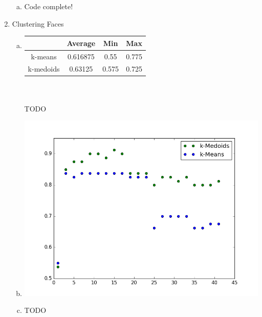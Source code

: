 \documentclass[11pt]{article}
\begin{document}
\begin{enumerate}[1]
\begin{enumerate}[(a)]
\item Code complete!
\end{enumerate}
\item Clustering Faces
\begin{enumerate}[(a)]
\item \begin{tabular}{| c | c | c | c |}
  \hline		
   & Average & Min & Max \\
  \hline
  k-means & 0.616875 & 0.55 & 0.775 \\
  k-medoids & 0.63125 & 0.575 & 0.725   \\
  \hline
\end{tabular}\\ \\
TODO
\item \includegraphics[scale=0.7]{figure_1}
\item TODO
\end{enumerate}
\end{enumerate}
\end{document}
